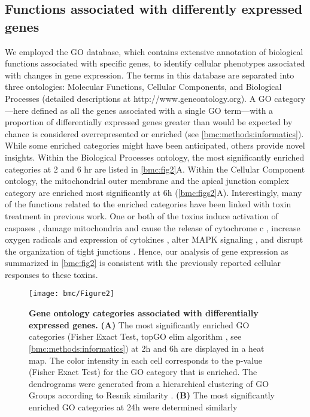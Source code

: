 \subsection{Functions associated with differently expressed genes}

We employed the GO database, which contains extensive annotation of biological functions associated with specific genes, to identify cellular phenotypes associated with changes in gene expression. The terms in this database are separated into three ontologies: Molecular Functions, Cellular Components, and Biological Processes (detailed descriptions at http://www.geneontology.org). A GO category—here defined as all the genes associated with a single GO term—with a proportion of differentially expressed genes greater than would be expected by chance is considered overrepresented or enriched (see \ref{bmc:methods:informatics}). While some enriched categories might have been anticipated, others provide novel insights. Within the Biological Processes ontology, the most significantly enriched categories at 2 and 6 hr are listed in \autoref{bmc:fig2}A. Within the Cellular Component ontology, the mitochondrial outer membrane and the apical junction complex category are enriched most significantly at 6h (\autoref{bmc:figs2}A). Interestingly, many of the functions related to the enriched categories have been linked with toxin treatment in previous work. One or both of the toxins induce activation of caspases \cite{Gerhard:2008wz, QaaposDan:2002uj, Carneiro:2006cw, Brito:2002ky}, damage mitochondria and cause the release of cytochrome c \cite{Matarrese:2007ix, He:2000uc}, increase oxygen radicals and expression of cytokines \cite{He:2002cl,Qiu:1999us,Flegel:1991ws}, alter MAPK signaling \cite{Meyer:2007kj,Lee:2007gj,Na:2005bx}, and disrupt the organization of tight junctions \cite{Nusrat:2001cs}. Hence, our analysis of gene expression as summarized in \autoref{bmc:fig2} is consistent with the previously reported cellular responses to these toxins.

\begin{figure}[h!]
  \centering
  \texttt{[image: bmc/Figure2]}
  \caption[Gene ontology categories associated with differentially expressed genes]{
  \textbf{Gene ontology categories associated with differentially expressed genes.}
  \textbf{(A)} The most significantly enriched GO categories (Fisher Exact Test, topGO elim algorithm \cite{Alexa:2006hg}, see \ref{bmc:methods:informatics}) at 2h and 6h are displayed in a heat map. The color intensity in each cell corresponds to the p-value (Fisher Exact Test) for the GO category that is enriched. The dendrograms were generated from a hierarchical clustering of GO Groups according to Resnik similarity \cite{Resnik:1999jl}.
\textbf{(B)} The most significantly enriched GO categories at 24h were determined similarly
}
  \label{bmc:fig2}
\end{figure}


